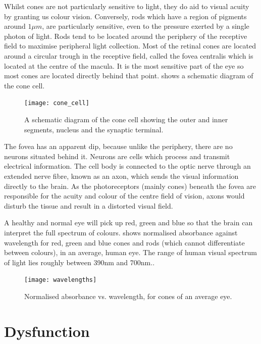 Whilst cones are not particularly sensitive to light, they do aid to visual
acuity by granting us colour vision.\cite{bowmaker1980visual} Conversely, rods
which have a region of pigments around $1\mu{m}$, are particularly sensitive,
even to the pressure exerted by a single photon of light. Rods tend to be
located around the periphery of the receptive field to maximise peripheral light
collection.\cite{liebman1964sensitive,baylor1979responses}
Most of the retinal cones are located around a circular trough in the
receptive field, called the fovea centralis which is located at the centre
of the macula.\cite{hendrickson1994primate} 
It is the most sensitive part of the eye so most cones are located directly
behind that point. shows a schematic diagram of the cone cell.


\begin{figure}[!htbp]
 \centering
   \texttt{[image: cone\_cell]}
 \caption{A schematic diagram of the cone cell showing the outer and inner segments, nucleus
 and the synaptic terminal.\cite{wikicone}}
 \label{fig:cone}
\end{figure}

The fovea has an apparent dip, because unlike the periphery,
there are no neurons situated behind it. Neurons are cells which process
and transmit electrical information. The cell body is connected to the optic
nerve through an extended nerve fibre, known as an axon, which sends the visual
information directly to the brain. As the photoreceptors (mainly cones) beneath
the fovea are responsible for the acuity and colour of the centre field of vision,
axons would disturb the tissue and result in a distorted visual field.

A healthy and normal eye will pick up red, green and blue so that the brain
can interpret the full spectrum of colours. 
shows normalised absorbance against wavelength for red, green and blue cones
and rods (which cannot differentiate between colours), in an average, human eye.
The range of human visual spectrum of light lies roughly between 390nm
and 700nm.\cite{starr2010biology}.

\begin{figure}[!htbp]
 \centering
   \texttt{[image: wavelengths]}
 \caption{Normalised absorbance vs. wavelength, for cones of an average eye.\cite{wikicones}}
 \label{fig:wavelengths}
\end{figure}

\section{Dysfunction}

